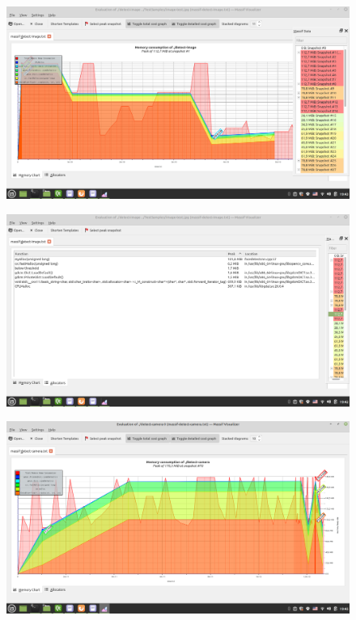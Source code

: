 \documentclass{article}
\begin{document}
\begin{figure}[H]
    \centering
    \includegraphics[width=12cm]{img/massif/massif_detect_image_memory.png}
    \caption{}
    \label{dim:massif}
\end{figure}
\begin{figure}[H]
    \centering
    \includegraphics[width=12cm]{img/massif/massif_detect_image_allocators.png}
    \caption{}
    \label{dima:massif}
\end{figure}

\begin{figure}[H]
    \centering
    \includegraphics[width=12cm]{img/massif/massif_detect_camera_memory1.png}
    \caption{}
    \label{dcm:massif}
\end{figure}
\end{document}
